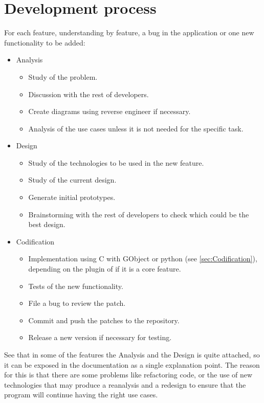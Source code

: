 
\chapter{Development process}


For each feature, understanding by feature, a bug in the application or one new functionality to be added:

\begin{itemize}
  \item Analysis
    \begin{itemize}
      \item Study of the problem.
      \item Discussion with the rest of developers.
      \item Create diagrams using reverse engineer if necessary.
      \item Analysis of the use cases unless it is not needed for the specific task.
    \end{itemize}
  \item Design
    \begin{itemize}
      \item Study of the technologies to be used in the new feature.
      \item Study of the current design.
      \item Generate initial prototypes.
      \item Brainstorming with the rest of developers to check which could be the best design.
    \end{itemize}
  \item Codification
    \begin{itemize}
      \item Implementation using C with GObject or python (see \ref{sec:Codification}), depending on the plugin of if it is a core feature.
      \item Tests of the new functionality.
      \item File a bug to review the patch.
      \item Commit and push the patches to the \GNOME repository.
      \item Release a new version if necessary for testing.
    \end{itemize}
\end{itemize}

\newpage
See that in some of the features the Analysis and the Design is quite attached, so it can be exposed in the documentation as a single explanation point. The reason for this is that there are some problems like refactoring code, or the use of new technologies that may produce a reanalysis and a redesign to ensure that the program will continue having the right use cases.
